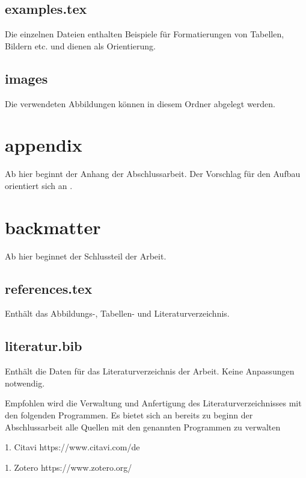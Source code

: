 \subsection*{examples.tex}

Die einzelnen Dateien enthalten Beispiele für Formatierungen von Tabellen, Bildern etc. und dienen als Orientierung.

\subsection*{images}

Die verwendeten Abbildungen können in diesem Ordner abgelegt werden. 

\newpage 

\section*{appendix}

Ab hier beginnt der Anhang der Abschlussarbeit. Der Vorschlag für den Aufbau orientiert sich an .

\section*{backmatter}

Ab hier beginnet der Schlussteil der Arbeit.

\subsection*{references.tex}

Enthält das Abbildungs-, Tabellen- und Literaturverzeichnis. 

\subsection*{literatur.bib}

Enthält die Daten für das Literaturverzeichnis der Arbeit. Keine Anpassungen notwendig.

Empfohlen wird die Verwaltung und Anfertigung des Literaturverzeichnisses mit den folgenden Programmen. Es bietet sich an bereits zu beginn der Abschlussarbeit alle Quellen mit den genannten Programmen zu verwalten

1. Citavi https://www.citavi.com/de

1. Zotero https://www.zotero.org/

\newpage

